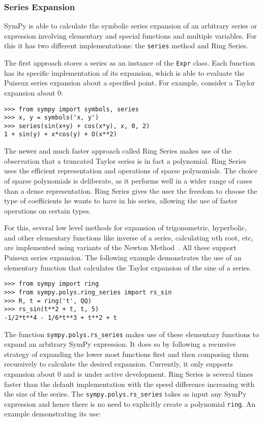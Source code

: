 \subsubsection{Series Expansion}

SymPy is able to calculate the symbolic series expansion of an arbitrary series
or expression involving elementary and special functions and multiple
variables. For this it has two different implementations: the \texttt{series}
method and Ring Series.

The first approach stores a series as an instance of the \texttt{Expr} class.
Each function has its specific implementation of its expansion, which is able to
evaluate the Puiseux series expansion about a specified point. For example,
consider a Taylor expansion about 0:

\begin{verbatim}
>>> from sympy import symbols, series
>>> x, y = symbols('x, y')
>>> series(sin(x+y) + cos(x*y), x, 0, 2)
1 + sin(y) + x*cos(y) + O(x**2)
\end{verbatim}

The newer and much faster approach called Ring Series makes use of the
observation that a truncated Taylor series is in fact a polynomial.
Ring Series uses the efficient representation and operations of sparse
polynomials. The choice of sparse polynomials is deliberate, as it performs
well in a wider range of cases than a dense representation. Ring Series gives
the user the freedom to choose the type of coefficients he wants to have in
his series, allowing the use of faster operations on certain types.

For this, several low level methods for expansion of trigonometric, hyperbolic,
and other elementary functions like inverse of a series, calculating $n$th
root, etc, are implemented using variants of the Newton Method~\cite{zimmerman}.
All these support Puiseux series expansion. The following example demonstrates
the use of an elementary function that calculates the Taylor expansion of the
sine of a series.

\begin{verbatim}
>>> from sympy import ring
>>> from sympy.polys.ring_series import rs_sin
>>> R, t = ring('t', QQ)
>>> rs_sin(t**2 + t, t, 5)
-1/2*t**4 - 1/6*t**3 + t**2 + t
\end{verbatim}

The function \texttt{sympy.polys.rs\_series} makes use of these elementary
functions to expand an arbitrary SymPy expression. It does so by following a
recursive strategy of expanding the lower most functions first and then
composing them recursively to calculate the desired expansion. Currently, it
only supports expansion about 0 and is under active development. Ring Series
is several times faster than the default implementation with the speed
difference increasing with the size of the series. The
\texttt{sympy.polys.rs\_series} takes as input any SymPy expression and hence
there is no need to explicitly create a polynomial \texttt{ring}. An example
demonstrating its use:

